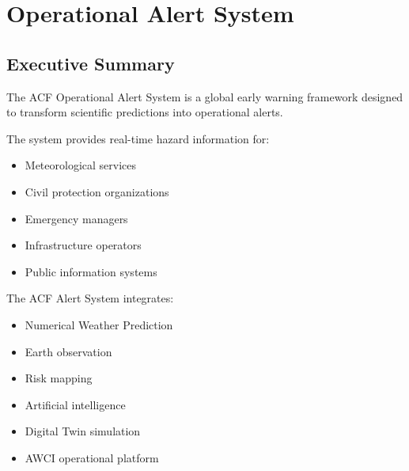 
\section{Operational Alert System}

\subsection{Executive Summary}

The ACF Operational Alert System is a global early warning framework
designed to transform scientific predictions into operational alerts.

The system provides real-time hazard information for:

\begin{itemize}

\item Meteorological services

\item Civil protection organizations

\item Emergency managers

\item Infrastructure operators

\item Public information systems

\end{itemize}


The ACF Alert System integrates:

\begin{itemize}

\item Numerical Weather Prediction

\item Earth observation

\item Risk mapping

\item Artificial intelligence

\item Digital Twin simulation

\item AWCI operational platform

\end{itemize}


